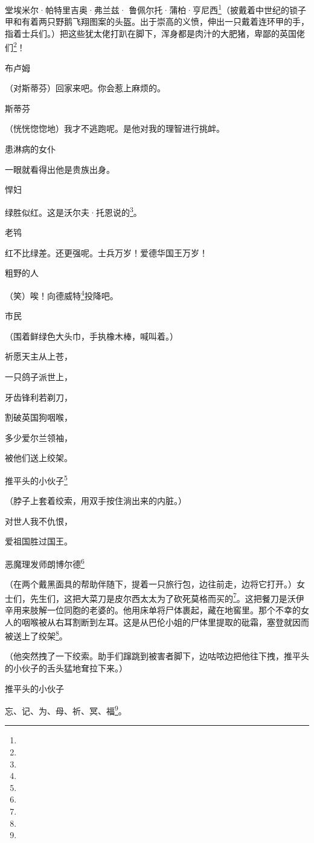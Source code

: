 \par 堂埃米尔·帕特里吉奥·弗兰兹· 鲁佩尔托·蒲柏·亨尼西\footnote{}（披戴着中世纪的锁子甲和有着两只野鹅飞翔图案的头盔。出于崇高的义愤，伸出一只戴着连环甲的手，指着士兵们。）把这些犹太佬打趴在脚下，浑身都是肉汁的大肥猪，卑鄙的英国佬们\footnote{}！
\par 布卢姆
\par （对斯蒂芬）回家来吧。你会惹上麻烦的。
\par 斯蒂芬
\par （恍恍惚惚地）我才不逃跑呢。是他对我的理智进行挑衅。
\par 患淋病的女仆
\par 一眼就看得出他是贵族出身。
\par 悍妇
\par 绿胜似红。这是沃尔夫·托恩说的\footnote{}。
\par 老鸨
\par 红不比绿差。还更强呢。士兵万岁！爱德华国王万岁！
\par 粗野的人
\par （笑）唉！向德威特\footnote{}投降吧。
\par 市民
\par （围着鲜绿色大头巾，手执橡木棒，喊叫着。）
\par 祈愿天主从上苍，
\par 一只鸽子派世上，
\par 牙齿锋利若剃刀，
\par 割破英国狗咽喉，
\par 多少爱尔兰领袖，
\par 被他们送上绞架。
\par 推平头的小伙子\footnote{}
\par （脖子上套着绞索，用双手按住淌出来的内脏。）
\par 对世人我不仇恨，
\par 爱祖国胜过国王。
\par 恶魔理发师朗博尔德\footnote{}
\par （在两个戴黑面具的帮助伴随下，提着一只旅行包，边往前走，边将它打开。）女士们，先生们，这把大菜刀是皮尔西太太为了砍死莫格而买的\footnote{}。这把餐刀是沃伊辛用来肢解一位同胞的老婆的。他用床单将尸体裹起，藏在地窖里。那个不幸的女人的咽喉被从右耳割断到左耳。这是从巴伦小姐的尸体里提取的砒霜，塞登就因而被送上了绞架\footnote{}。
\par （他突然拽了一下绞索。助手们蹿跳到被害者脚下，边咕哝边把他往下拽，推平头的小伙子的舌头猛地耷拉下来。）
\par 推平头的小伙子
\par 忘、记、为、母、祈、冥、福\footnote{}。
